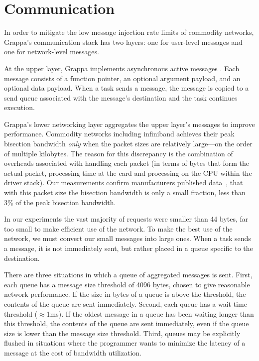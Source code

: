 \section{Communication}\label{sec:communication}

In order to mitigate the low message injection rate limits of commodity
networks, Grappa's communication stack has two layers: one for
user-level messages and one for network-level messages. 

At the upper layer, Grappa implements asynchronous active messages
\cite{vonEicken92}. Each message consists of a function pointer, an
optional argument payload, and an optional data payload. When a task
sends a message, the message is copied to a send queue associated with
the message's destination and the task continues execution.

Grappa's lower networking layer aggregates the upper layer's messages
to improve performance. Commodity networks including infiniband
achieves their peak bisection bandwidth \emph{only} when the packet
sizes are relatively large---on the order of multiple kilobytes. The
reason for this discrepancy is the combination of overheads associated
with handling each packet (in terms of bytes that form the actual
packet, processing time at the card and processing on the
CPU within the driver stack). Our measurements confirm manufacturers
published data~\cite{infinibandbandwidth}, that with this packet size
the bisection bandwidth is only a small fraction, less than
3\% of the peak bisection bandwidth.

In our experiments the vast majority of requests were smaller than
44 bytes, far too small to make
efficient use of the network. To make the best use of the network, we
must convert our small messages into large ones.
When a task sends a message,
it is not immediately sent, but rather placed in a queue specific to the
destination.

There are three situations in which a queue of aggregated messages is
sent. First, each queue has a message size threshold of 4096 bytes, chosen to give reasonable network performance. If the size in
bytes of a queue is above the threshold, the contents of the queue are
sent immediately. Second, each queue has a wait time threshold
($\approx${1ms}). If the oldest message in a queue has been waiting
longer than this threshold, the contents of the queue are sent
immediately, even if the queue size is lower than the message size
threshold.  Third, queues may be explicitly flushed in situations where
the programmer wants to minimize the latency of a message at the cost of
bandwidth utilization.

